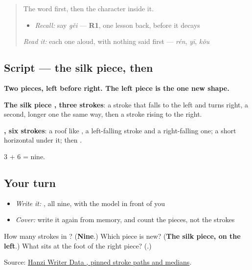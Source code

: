 \begin{quote}
The word first, then the character inside it.

\begin{itemize}
\raggedright
  \item \emph{Recall:} say \emph{gěi} — \textbf{R1}, one lesson back, before it decays
\end{itemize}

\begin{quote}
  
\end{quote}

\emph{Read it:} each one aloud, with nothing said first — \emph{rén}, \emph{yī}, \emph{kǒu}
\end{quote}

\subsection*{Script — the silk piece, then }

\begin{quote}
\end{quote}

\textbf{Two pieces, left before right. The left piece is the one new shape.}

\textbf{The silk piece , three strokes}: a stroke that falls to the left and turns right, a second, longer one the same way, then a stroke rising to the right.

\textbf{, six strokes}: a roof like , a left-falling stroke and a right-falling one; a short horizontal under it; then .

3 + 6 = nine.

\subsection*{Your turn}
\begin{itemize}
\raggedright
  \item \emph{Write it:} , all nine, with the model in front of you
  \item \emph{Cover:} write it again from memory, and count the pieces, not the strokes
\end{itemize}

\begin{tcolorbox}[breakable,colback=teal!4,colframe=teal!35!black,title={Before you move on}]
How many strokes in ? (\textbf{Nine}.) Which piece is new? (\textbf{The silk piece, on the left}.) What sits at the foot of the right piece? (\textbf{}.)

Source: \href{https://raw.githubusercontent.com/chanind/hanzi-writer-data/68d10a4b21150cae5e1ebbd223eed289cf32d90c/data/\%E7\%BB\%99.json}{Hanzi Writer Data , pinned stroke paths and medians}.
\end{tcolorbox}

